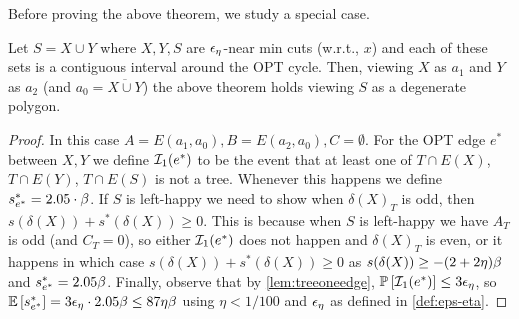 Before proving the above theorem, we study a special case.
\begin{lemma}\label{lem:trianglereduction}
	Let $S=X\cup Y$ where $X,Y,S$ are ${\epsilon}_{\eta}$-near min cuts (w.r.t., $x$) and each of these sets is a contiguous interval around the OPT cycle. Then, viewing $X$ as $a_1$ and $Y$ as $a_2$ (and $a_0=\overline{X\cup Y}$) the above theorem holds viewing $S$ as a degenerate polygon. %
\end{lemma}
\begin{proof}
In this case $A=E(a_1,a_0), B=E(a_2,a_0), C=\emptyset$.
For the OPT edge $e^*$ between $X,Y$ we define ${\cal I}_1(e^*)$ to be the event that at least one of $T\cap E(X)$, $T\cap E(Y)$, $T\cap E(S)$ is not a tree.
Whenever this happens we define $s^*_{e^*}=2.05 \cdot \beta$.
If $S$ is left-happy we need to show when $\delta(X)_T$ is odd, then $s(\delta(X))+s^*(\delta(X))\geq 0$. This is because when $S$ is left-happy we have $A_T$ is odd (and $C_T=0$), so either ${\cal I}_1(e^*)$ does not happen and $\delta(X)_T$ is even, or it happens in which case $s(\delta(X))+s^*(\delta(X))\geq 0$ as $s(\delta(X))\ge -(2+2\eta)\beta$ and $s^*_{e^*}=2.05\beta$.
Finally, observe that by \cref{lem:treeoneedge}, 
${\mathbb{P}}\left[ {{\cal I}_1(e^*)}\right]\le 3 {\epsilon}_\eta$, so
${\mathbb{E}}\left[s^*_{e^*}\right]=3{\epsilon}_\eta \cdot 2.05\beta \leq 87\eta \beta$ using $\eta < 1/100$ and ${\epsilon}_\eta$ as defined in \cref{def:eps-eta}.
\end{proof}





